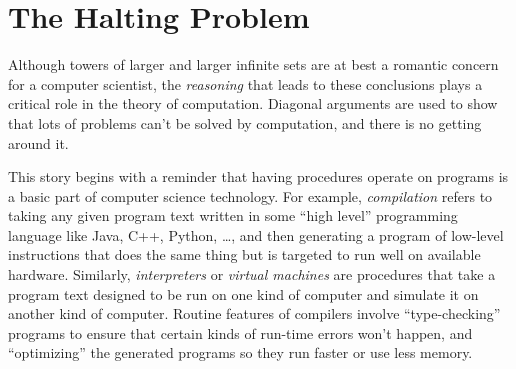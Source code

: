 \begin{problems}
\practiceproblems

\classproblems
{}

\homeworkproblems
{}

\examproblems
{}
\end{problems}

\section{The Halting Problem}\label{halting_sec}

Although towers of larger and larger infinite sets are at best a
romantic concern for a computer scientist, the \emph{reasoning} that
leads to these conclusions plays a critical role in the theory of
computation.  Diagonal arguments are used to show that lots of
problems can't be solved by computation, and there is no getting
around it.

This story begins with a reminder that having procedures operate on
programs is a basic part of computer science technology.  For example,
\emph{compilation} refers to taking any given program text
written in some ``high level'' programming language like Java, C++,
Python, \dots, and then generating a program of low-level instructions
that does the same thing but is targeted to run well on available
hardware.  Similarly, \emph{interpreters} or \emph{virtual
    machines} are procedures that take a program text designed to be
run on one kind of computer and simulate it on another kind of
computer.  Routine features of compilers involve
``type-checking''%
programs to ensure that certain kinds of
run-time errors won't happen, and ``optimizing'' the generated
programs so they run faster or use less memory.

